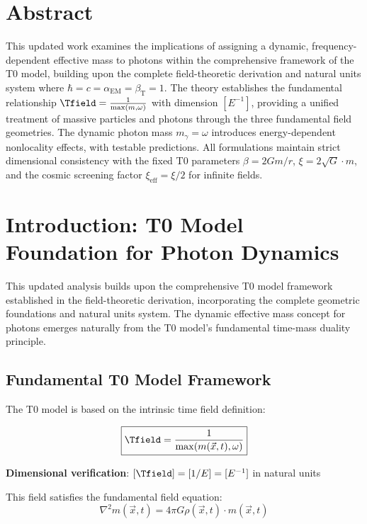 \section*{Abstract}
		This updated work examines the implications of assigning a dynamic, frequency-dependent effective mass to photons within the comprehensive framework of the T0 model, building upon the complete field-theoretic derivation and natural units system where $\hbar = c = \alpha_{\text{EM}} = \beta_{\text{T}} = 1$. The theory establishes the fundamental relationship $\Tfield = \frac{1}{\max(m, \omega)}$ with dimension $[E^{-1}]$, providing a unified treatment of massive particles and photons through the three fundamental field geometries. The dynamic photon mass $m_\gamma = \omega$ introduces energy-dependent nonlocality effects, with testable predictions. All formulations maintain strict dimensional consistency with the fixed T0 parameters $\beta = 2Gm/r$, $\xi = 2\sqrt{G} \cdot m$, and the cosmic screening factor $\xi_{\text{eff}} = \xi/2$ for infinite fields.

	

	\section{Introduction: T0 Model Foundation for Photon Dynamics}
	
	This updated analysis builds upon the comprehensive T0 model framework established in the field-theoretic derivation, incorporating the complete geometric foundations and natural units system. The dynamic effective mass concept for photons emerges naturally from the T0 model's fundamental time-mass duality principle.
	
	\subsection{Fundamental T0 Model Framework}
	
	The T0 model is based on the intrinsic time field definition:
	
	\begin{equation}
		\boxed{\Tfield = \frac{1}{\max(m(\vec{x},t), \omega)}}
		\label{eq:intrinsic_time_field}
	\end{equation}
	
	\textbf{Dimensional verification}: $[\Tfield] = [1/E] = [E^{-1}]$ in natural units \checkmark
	
	This field satisfies the fundamental field equation:
	\begin{equation}
		\nabla^2 m(\vec{x},t) = 4\pi G \rho(\vec{x},t) \cdot m(\vec{x},t)
		\label{eq:field_equation}
	\end{equation}
	
